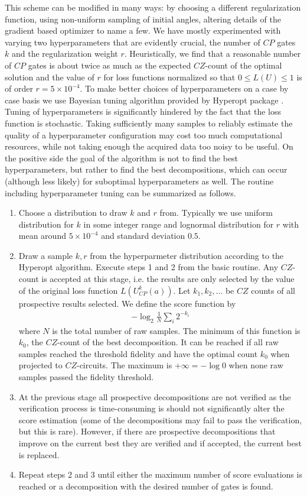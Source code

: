 \documentclass[amsfonts, amssymb, aps, nofootinbib]{revtex4-2}
\begin{document}
This scheme can be modified in many ways: by choosing a different regularization function, using non-uniform sampling of initial angles, altering details of the gradient based optimizer to name a few. We have mostly experimented with varying two hyperparameters that are evidently crucial, the number of $CP$ gates $k$ and the regularization weight $r$. Heuristically, we find that a reasonable number of $CP$ gates is about twice as much as the expected $CZ$-count of the optimal solution and the value of $r$ for loss functions normalized so that $0\le L(U) \le 1$ is of order $r=5\times 10^{-4}$. To make better choices of hyperparameters on a case by case basis we use Bayesian tuning algorithm provided by Hyperopt package \cite{hyperopt, ?}. Tuning of hyperparameters is significantly hindered by the fact that the loss function is stochastic. Taking sufficiently many samples to reliably estimate the quality of a hyperparameter configuration may cost too much computational resources, while not taking enough the acquired data too noisy to be useful. On the positive side the goal of the algorithm is not to find the best hyperparameters, but rather to find the best decompositions, which can occur (although less likely) for suboptimal hyperparameters as well. The routine including hyperparameter tuning can be summarized as follows.

\begin{enumerate}
\item Choose a distribution to draw $k$ and $r$ from. Typically we use uniform distribution for $k$ in some integer range and lognormal distribution for $r$ with mean around $5\times 10^{-4}$ and standard deviation $0.5$.
\item Draw a sample $k, r$ from the hyperparmeter distribution according to the Hyperopt algorithm. Execute steps 1 and 2 from the basic routine. Any $CZ$-count is accepted at this stage, i.e. the results are only selected by the value of the original loss function $L(U_{CP}^k(a))$. Let $k_1, k_2,\dots$ be $CZ$ counts of all prospective results selected. We define the score function by
\begin{align}
-\log_2\frac{1}{N}\sum_{i}2^{-k_i}
\end{align}
where $N$ is the total number of raw samples. The minimum of this function is $k_0$, the $CZ$-count of the best decomposition. It can be reached if all raw samples reached the threshold fidelity and have the optimal count $k_0$ when projected to $CZ$-circuits. The maximum is $+\infty=-\log 0$ when none raw samples passed the fidelity threshold.
\item At the previous stage all prospective decompositions are not verified as the verification process is time-consuming is should not significantly alter the score estimation (some of the decompositions may fail to pass the verification, but this is rare). However, if there are prospective decompositions that improve on the current best they are verified and if accepted, the current best is replaced.

\item Repeat steps 2 and 3 until either the maximum number of score evaluations is reached or a decomposition with the desired number of gates is found.
\end{enumerate}
\end{document}
